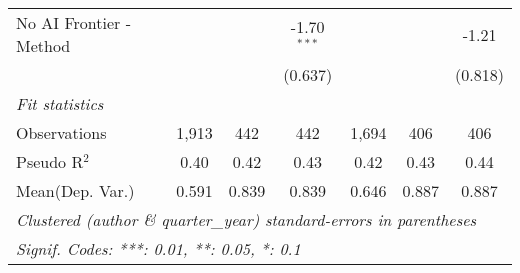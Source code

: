 \begin{tabular}{lcccccc}
   No AI Frontier - Method &                &         & -1.70$^{***}$ &               &         & -1.21\\   
                           &                &         & (0.637)       &               &         & (0.818)\\   
   \midrule
   \emph{Fit statistics}\\
   Observations            & 1,913          & 442     & 442           & 1,694         & 406     & 406\\  
   Pseudo R$^2$            & 0.40           & 0.42    & 0.43          & 0.42          & 0.43    & 0.44\\  
Mean(Dep. Var.) & 0.591 & 0.839 & 0.839 & 0.646 & 0.887 & 0.887 \\
   \midrule \midrule
   \multicolumn{7}{l}{\emph{Clustered (author \& quarter\_year) standard-errors in parentheses}}\\
   \multicolumn{7}{l}{\emph{Signif. Codes: ***: 0.01, **: 0.05, *: 0.1}}\\
\end{tabular}
\par\endgroup
